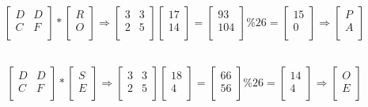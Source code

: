 \documentclass{article}
\begin{document}
  \\
\[\begin{bmatrix}
   D& D\\
    C& F\\
  \end{bmatrix} * \begin{bmatrix}
   R\\
   O\\
  \end{bmatrix} \Rightarrow
    \begin{bmatrix}
    3& 3\\
    2& 5\\
  \end{bmatrix}
   \begin{bmatrix}
   17\\
   14\\
  \end{bmatrix} = \begin{bmatrix}
   93\\
   104\\
  \end{bmatrix} \% 26 = \begin{bmatrix}
   15\\
   0\\
  \end{bmatrix} \Rightarrow
  \begin{bmatrix}
   P\\
   A\\
  \end{bmatrix}
  \]
  
   \\
\[\begin{bmatrix}
   D& D\\
    C& F\\
  \end{bmatrix} * \begin{bmatrix}
   S\\
   E\\
  \end{bmatrix} \Rightarrow
    \begin{bmatrix}
   3& 3\\
    2& 5\\
  \end{bmatrix}
   \begin{bmatrix}
   18\\
    4\\
  \end{bmatrix} = \begin{bmatrix}
   66\\
   56\\
  \end{bmatrix} \% 26 = \begin{bmatrix}
   14\\
   4\\
\end{bmatrix}\Rightarrow
  \begin{bmatrix}
   O\\
   E\\
  \end{bmatrix}
  \]
\end{document}
